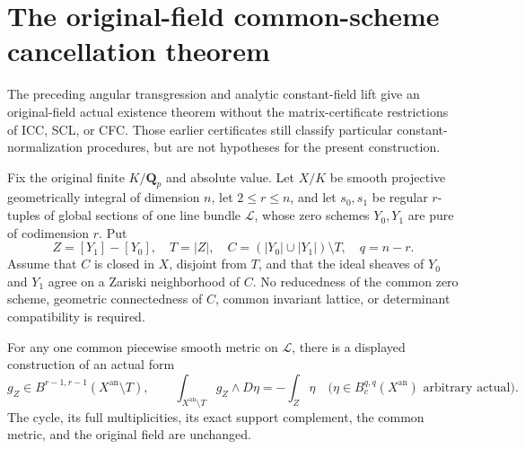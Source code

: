 \section{The original-field common-scheme cancellation theorem}
\label{sec:r9-original-field-common-scheme-cancellation}

The preceding angular transgression and analytic constant-field
lift give an original-field actual existence theorem without the
matrix-certificate restrictions of ICC, SCL, or CFC.  Those earlier
certificates still classify particular constant-normalization
procedures, but are not hypotheses for the present construction.

\begin{theorem}
\label{thm:r9-original-field-common-scheme-cancellation}
Fix the original finite $K/\mathbf Q_p$ and absolute value.  Let
$X/K$ be smooth projective geometrically integral of dimension $n$,
let $2\le r\le n$, and let $s_0,s_1$ be regular $r$-tuples of
global sections of one line bundle $\mathcal L$, whose zero schemes
$Y_0,Y_1$ are pure of codimension $r$.  Put
\[
 Z=[Y_1]-[Y_0],\quad T=|Z|,\quad
 C=(|Y_0|\cup|Y_1|)\setminus T,\quad q=n-r.
 \tag{OFC1}
\]
Assume that $C$ is closed in $X$, disjoint from $T$, and that
the ideal sheaves of $Y_0$ and $Y_1$ agree on a Zariski
neighborhood of $C$.  No reducedness of the common zero scheme,
geometric connectedness of $C$, common invariant lattice,
or determinant compatibility is required.

For any one common piecewise smooth metric on $\mathcal L$,
there is a displayed construction of an actual form
\[
 g_Z\in B^{r-1,r-1}(X^{\mathrm{an}}\setminus T),\qquad
 \int_{X^{\mathrm{an}}\setminus T}g_Z\wedge D\eta=-\int_Z\eta
 \quad\bigl(\eta\in B_c^{q,q}(X^{\mathrm{an}})
                                  \text{ arbitrary actual}\bigr).
 \tag{OFC2}
\]
The cycle, its full multiplicities, its exact support complement,
the common metric, and the original field are unchanged.
\end{theorem}

